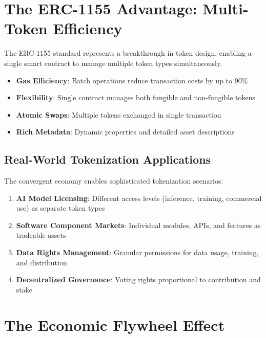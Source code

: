 \documentclass[11pt,a4paper]{report}
\begin{document}
\section{The ERC-1155 Advantage: Multi-Token Efficiency}

The ERC-1155 standard represents a breakthrough in token design, enabling a single smart contract to manage multiple token types simultaneously.

\begin{keypoint}
\begin{itemize}
    \item \textbf{Gas Efficiency}: Batch operations reduce transaction costs by up to 90\%
    \item \textbf{Flexibility}: Single contract manages both fungible and non-fungible tokens
    \item \textbf{Atomic Swaps}: Multiple tokens exchanged in single transaction
    \item \textbf{Rich Metadata}: Dynamic properties and detailed asset descriptions
\end{itemize}
\end{keypoint}

\subsection{Real-World Tokenization Applications}

The convergent economy enables sophisticated tokenization scenarios:

\begin{enumerate}
    \item \textbf{AI Model Licensing}: Different access levels (inference, training, commercial use) as separate token types
    \item \textbf{Software Component Markets}: Individual modules, APIs, and features as tradeable assets
    \item \textbf{Data Rights Management}: Granular permissions for data usage, training, and distribution
    \item \textbf{Decentralized Governance}: Voting rights proportional to contribution and stake
\end{enumerate}

\section{The Economic Flywheel Effect}
\end{document}
